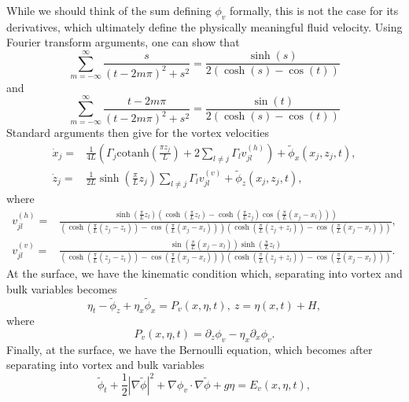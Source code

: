 \documentclass[a4paper,11pt]{article}
\newcommand{\p}{\partial}
\begin{document}
While we should think of the sum defining $\phi_{v}$ formally, this is not the case for its derivatives, which ultimately define the physically meaningful fluid velocity.  Using Fourier transform arguments, one can show that 
\[
\sum_{m=-\infty}^{\infty}\frac{s}{(t-2m\pi)^{2}+s^{2}} = \frac{\sinh(s)}{2(\cosh(s)-\cos(t))}
\]
and
\[
\sum_{m=-\infty}^{\infty}\frac{t-2m\pi}{(t-2m\pi)^{2}+s^{2}} = \frac{\sin(t)}{2(\cosh(s)-\cos(t))}
\]
Standard arguments then give for the vortex velocities
\begin{align}
\dot{x}_{j} = & \frac{1}{4L}\left(  \Gamma_{j}\mbox{cotanh}\left(\frac{\pi z_{j}}{L} \right)+2\sum_{l\neq j}\Gamma_{l}v_{jl}^{(h)} \right)+ \tilde{\phi}_{x}(x_{j},z_{j},t),\label{xveloc}\\
\dot{z}_{j} = & \frac{1}{2L}\sinh\left(\frac{\pi}{L}z_{j}\right)\sum_{l\neq j} \Gamma_{l} v_{jl}^{(v)} + \tilde{\phi}_{z}(x_{j},z_{j},t),\label{zveloc}
\end{align}
where
\begin{align*}
v_{jl}^{(h)} = & \frac{\sinh\left(\frac{\pi}{L}z_{l}\right)\left(\cosh(\frac{\pi}{L}z_{l})-\cosh(\frac{\pi}{L}z_{j})\cos\left(\frac{\pi}{L}(x_{j}-x_{l})\right)\right)}{\left(\cosh\left(\frac{\pi}{L}(z_{j}-z_{l})\right)-\cos\left(\frac{\pi}{L}(x_{j}-x_{l})\right)\right)\left(\cosh\left(\frac{\pi}{L}(z_{j}+z_{l})\right)-\cos\left(\frac{\pi }{L}(x_{j}-x_{l})\right)\right)}, \\
v_{jl}^{(v)} = & \frac{\sin\left(\frac{\pi}{L}(x_{j}-x_{l})\right)\sinh\left(\frac{\pi}{L}z_{l}\right)}{\left(\cosh\left(\frac{\pi}{L}(z_{j}-z_{l})\right)-\cos\left(\frac{\pi}{L}(x_{j}-x_{l})\right)\right)\left(\cosh\left(\frac{\pi}{L}(z_{j}+z_{l})\right)-\cos\left(\frac{\pi }{L}(x_{j}-x_{l})\right)\right)}.
\end{align*}
At the surface, we have the kinematic condition which, separating into vortex and bulk variables becomes 
\begin{equation}
\eta_{t} - \tilde{\phi}_{z} + \eta_{x}\tilde{\phi}_{x} =  P_{v}(x,\eta,t), ~ z =  \eta(x,t)+H,  
\label{unsckin}
\end{equation}
where
\[
P_{v}(x,\eta,t) =   \p_{z}\phi_{v} -  \eta_{x}\p_{x}\phi_{v} .
\]
Finally, at the surface, we have the Bernoulli equation, which becomes after separating into vortex and bulk variables  
\begin{equation}
\tilde{\phi}_{t} + \frac{1}{2 }\left| \nabla \tilde{\phi} \right|^{2} +  \nabla\phi_{v}\cdot \nabla\tilde{\phi} + g\eta = E_{v}(x,\eta,t),
\label{unscbern}
\end{equation}
\end{document}
